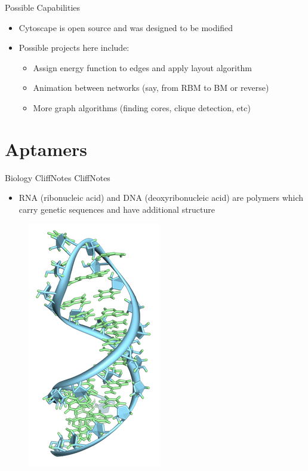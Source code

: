 \documentclass{beamer}
\begin{document}
\begin{frame}{Possible Capabilities}
  \begin{itemize}
    \item Cytoscape is open source and was designed to be modified
    \item Possible projects here include:
    \begin{itemize}
      \item Assign energy function to edges and apply layout algorithm
      \item Animation between networks (say, from RBM to BM or reverse)
      \item More graph algorithms (finding cores, clique detection, etc)
    \end{itemize}
  \end{itemize}
  
\end{frame}
\section{Aptamers}
\begin{frame}{Biology CliffNotes CliffNotes}
  \begin{itemize}
    \item RNA (ribonucleic acid) and DNA (deoxyribonucleic acid) are polymers which carry genetic sequences and have additional structure
  \end{itemize}
  \begin{figure}
    \begin{center}
      \includegraphics[width=.3\textwidth]{rna.png}
    \end{center}
  \end{figure}
\end{frame}
\end{document}
